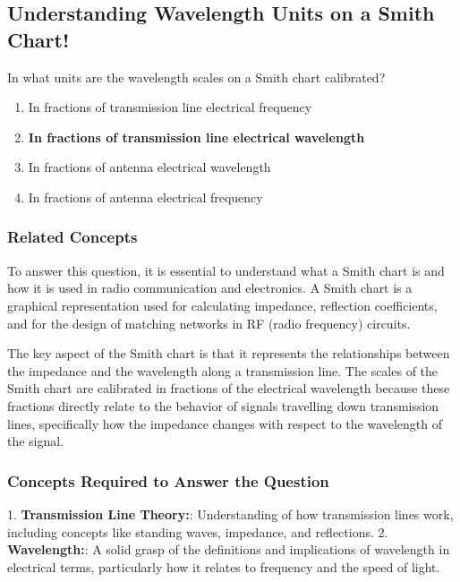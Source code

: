 \subsection{Understanding Wavelength Units on a Smith Chart!}

\begin{tcolorbox}[colback=gray!10, colframe=black, title=E9G11]
In what units are the wavelength scales on a Smith chart calibrated? 

\begin{enumerate}[label=\Alph*.]
    \item In fractions of transmission line electrical frequency
    \item \textbf{In fractions of transmission line electrical wavelength}
    \item In fractions of antenna electrical wavelength
    \item In fractions of antenna electrical frequency
\end{enumerate} \end{tcolorbox}

\subsubsection*{Related Concepts}

To answer this question, it is essential to understand what a Smith chart is and how it is used in radio communication and electronics. A Smith chart is a graphical representation used for calculating impedance, reflection coefficients, and for the design of matching networks in RF (radio frequency) circuits.

The key aspect of the Smith chart is that it represents the relationships between the impedance and the wavelength along a transmission line. The scales of the Smith chart are calibrated in fractions of the electrical wavelength because these fractions directly relate to the behavior of signals travelling down transmission lines, specifically how the impedance changes with respect to the wavelength of the signal.

\subsubsection*{Concepts Required to Answer the Question}

1. \textbf{Transmission Line Theory:}: Understanding of how transmission lines work, including concepts like standing waves, impedance, and reflections.
2. \textbf{Wavelength:}: A solid grasp of the definitions and implications of wavelength in electrical terms, particularly how it relates to frequency and the speed of light.

